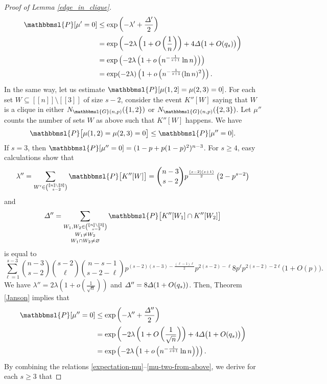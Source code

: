 \documentclass[hidelinks, 11pt]{article}
\theoremstyle{plain}
\theoremstyle{definition}
\begin{document}
\begin{proof}[Proof of Lemma \ref{edge_in_clique}]
\begin{align}
\mathbbmsl{P}[\mu'=0]&\leq\exp\left(-\lambda'+\frac{\mathnormal{\Delta}'}{2}\right)\nonumber\\&=\exp\left(-2\lambda\left(1+O\left(\frac{1}{n}\right)\right)+4\mathnormal{\Delta}\big(1+O(q_s)\big)\right)\nonumber\\&=
\exp\left(-2\lambda\left(1+o\left(n^{-\frac{1}{s+1}}\ln n\right)\right)\right)\nonumber\\&=\exp(-2\lambda)\left(1+o\left(n^{-\frac{1}{s+1}}(\ln  n)^2\right)\right).\label{mu-one-from-above}
\end{align}
In the same way, let us estimate $\mathbbmsl{P}[\mu(1,2]=\mu(2,3)=0]$.
For each  set $W\subseteq[\![n]\!]\setminus[\![3]\!]$ of size $s-2$, consider the  event $K''[W]$ saying that   $W$ is a clique in either $N_{\mathbbmsl{G}(n,p)}(\{1, 2\})$ or   $N_{\mathbbmsl{G}(n,p)}(\{2, 3\})$. Let $\mu''$ counts the number of sets $W$ as above such that $K''[W]$ happens. We have
\begin{equation}
\mathbbmsl{P}\big[\mu(1,2)=\mu(2,3)=0\big]\leq\mathbbmsl{P}[\mu''=0].\label{mu-two}
\end{equation}
If $s=3$, then $\mathbbmsl{P}[\mu''=0]=(1-p+p(1-p)^2)^{n-3}$. For $s\geq 4$, easy  calculations   show that
$$\lambda''=\sum_{W'\in{[\![n]\!]\setminus[\![3]\!]\choose s-2}}\mathbbmsl{P}\big[K''[W]\big]={n-3\choose s-2}p^{\frac{(s-2)(s+1)}{2}}\left(2-p^{s-2}\right)$$ and
$$\mathnormal{\Delta}''=\mathop{\mathop{\sum_{W_1,W_2\in{[\![n]\!]\setminus[\![3]\!]\choose s-2}}}_{W_1\neq W_2}}_{W_1\cap W_2\neq\varnothing}\mathbbmsl{P}\big[K''[W_1]\cap K''[W_2]\big]$$ is equal to
$$\sum_{\ell=1}^{s-3}{n-3\choose s-2}{s-2\choose\ell}{n-s-1\choose s-2-\ell}p^{(s-2)(s-3)-\frac{(\ell-1)\ell}{2}}p^{2(s-2)-\ell}8p^{\ell}p^{2(s-2)-2\ell}\big(1+O(p)\big).$$
We have $\lambda''=2\lambda(1+o(\tfrac{1}{\sqrt{n}}))$ and $\mathnormal{\Delta}''=8\mathnormal{\Delta}(1+O(q_s))$.
Then, Theorem \ref{Janson} implies that
\begin{align}
\mathbbmsl{P}[\mu''=0]&\leq\exp\left(-\lambda''+\frac{\mathnormal{\Delta}''}{2}\right)\nonumber\\&=\exp\left(-2\lambda\left(1+O\left(\frac{1}{\sqrt{n}}\right)\right)+4\mathnormal{\Delta}\big(1+O(q_s)\big)\right)
\nonumber\\&=\exp\left(-2\lambda\left(1+o\left(n^{-\frac{1}{s+1}}\ln n\right)\right)\right).\label{mu-two-from-above}
\end{align}
By combining the relations \eqref{expectation-mu}--\eqref{mu-two-from-above}, we derive  for each  $s\geq3$  that

\end{proof}
\end{document}
